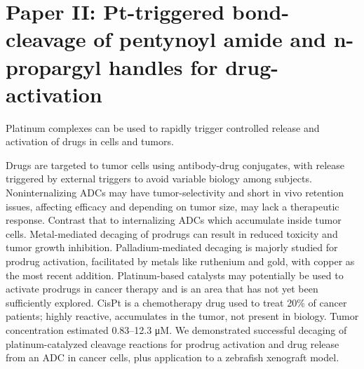 \chapter{Paper II:\@
  Pt-triggered bond-cleavage of pentynoyl amide
  and n-propargyl handles for drug-activation
 }%
\label{ch:paper2}


Platinum complexes can be used to rapidly trigger controlled release and activation of drugs in cells and tumors.

Drugs are targeted to tumor cells using antibody-drug conjugates, with release triggered by external triggers to avoid variable biology among subjects.
Noninternalizing ADCs may have tumor-selectivity and short in vivo retention issues, affecting efficacy and depending on tumor size, may lack a therapeutic response.
Contrast that to internalizing ADCs which accumulate inside tumor cells.
Metal-mediated decaging of prodrugs can result in reduced toxicity and tumor growth inhibition.
Palladium-mediated decaging is majorly studied for prodrug activation, facilitated by metals like ruthenium and gold, with copper as the most recent addition.
Platinum-based catalysts may potentially be used to activate prodrugs in cancer therapy and is an area that has not yet been sufficiently explored.
CisPt is a chemotherapy drug used to treat 20\% of cancer patients; highly reactive, accumulates in the tumor, not present in biology.
Tumor concentration estimated 0.83–12.3 μM.
We demonstrated successful decaging of platinum-catalyzed cleavage reactions for prodrug activation and drug release from an ADC in cancer cells, plus application to a zebrafish xenograft model.

